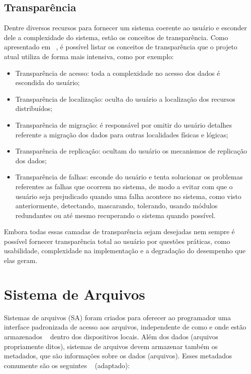     
    \subsection{Transparência}
    
        Dentre diversos recursos para fornecer um sistema coerente ao usuário e esconder dele a complexidade do sistema, estão os conceitos de transparência. Como apresentado em ~\cite{tanenbaum}, é possível listar os conceitos de transparência que o projeto atual utiliza de forma mais intensiva, como por exemplo:
    
        \begin{itemize}
            \item Transparência de acesso: toda a complexidade no acesso dos dados é escondida do usuário;
            
            \item Transparência de localização: oculta do usuário a localização dos recursos distribuídos;
            
            \item Transparência de migração: é responsável por omitir do usuário detalhes referente a migração dos dados para outras localidades físicas e lógicas;
            
            \item Transparência de replicação: ocultam do usuário os mecanismos de replicação dos dados;
            
            \item Transparência de falhas: esconde do usuário e tenta solucionar os problemas referentes as falhas que ocorrem no sistema, de modo a evitar com que o usuário seja prejudicado quando uma falha acontece no sistema, como visto anteriormente, detectando, mascarando, tolerando, usando módulos redundantes ou até mesmo recuperando o sistema quando possível.
        \end{itemize}
    
        Embora todas essas camadas de transparência sejam desejadas nem sempre é possível fornecer transparência total ao usuário por questões práticas, como usabilidade, complexidade na implementação e a degradação do desempenho que elas geram.

\section {Sistema de Arquivos}
    Sistemas de arquivos (SA) foram criados para oferecer ao programador uma interface padronizada de acesso aos arquivos, independente de como e onde estão armazenados ~\cite{coulouris} dentro dos dispositivos locais. 
    Além dos dados (arquivos propriamente ditos), sistemas de arquivos devem armazenar também os metadados, que são informações sobre os dados (arquivos). Esses metadados comumente são os seguintes ~\cite{coulouris} (adaptado):
    
